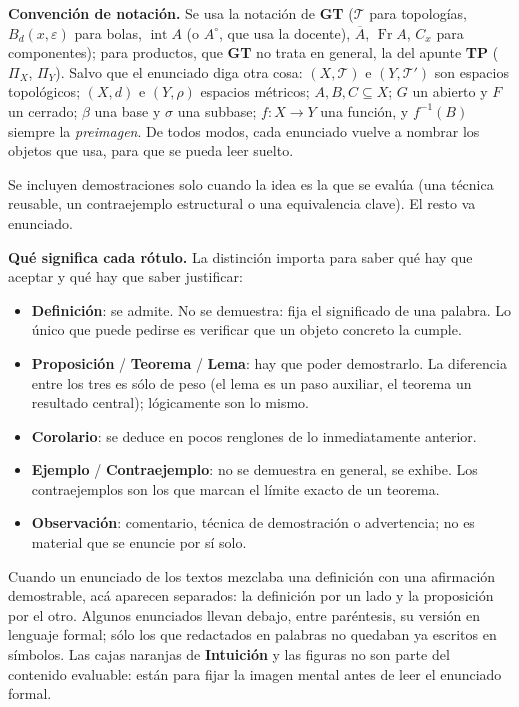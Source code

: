 \documentclass[11pt,a4paper]{article}
\newenvironment{lista}{\leavevmode\begin{itemize}[leftmargin=1.5em,itemsep=1pt,topsep=2pt,parsep=0pt]}{\end{itemize}}
\theoremstyle{definition}
\theoremstyle{plain}
\newcommand{\cl}[1]{\overline{#1}}
\newcommand{\intr}{\operatorname{int}}
\newcommand{\tp}{\mathcal{T}}
\begin{document}
\medskip
\noindent\textbf{Convención de notación.} Se usa la notación de \textbf{GT} ($\mathcal T$ para topologías, $B_d(x,\varepsilon)$ para bolas, $\intr A$ (o $A^\circ$, que usa la docente), $\cl A$, $\operatorname{Fr}A$, $C_x$ para componentes); para productos, que \textbf{GT} no trata en general, la del apunte \textbf{TP} ($\Pi_X$, $\Pi_Y$). Salvo que el enunciado diga otra cosa: $(X,\tp)$ e $(Y,\tp')$ son espacios topológicos; $(X,d)$ e $(Y,\rho)$ espacios métricos; $A,B,C\subseteq X$; $G$ un abierto y $F$ un cerrado; $\beta$ una base y $\sigma$ una subbase; $f:X\to Y$ una función, y $f^{-1}(B)$ siempre la \emph{preimagen}. De todos modos, cada enunciado vuelve a nombrar los objetos que usa, para que se pueda leer suelto.

\noindent Se incluyen demostraciones solo cuando la idea es la que se evalúa (una técnica reusable, un contraejemplo estructural o una equivalencia clave). El resto va enunciado.

\medskip
\noindent\textbf{Qué significa cada rótulo.} La distinción importa para saber qué hay que aceptar y qué hay que saber justificar:
\begin{lista}
\item \textbf{Definición}: se admite. No se demuestra: fija el significado de una palabra. Lo único que puede pedirse es verificar que un objeto concreto la cumple.
\item \textbf{Proposición} / \textbf{Teorema} / \textbf{Lema}: hay que poder demostrarlo. La diferencia entre los tres es sólo de peso (el lema es un paso auxiliar, el teorema un resultado central); lógicamente son lo mismo.
\item \textbf{Corolario}: se deduce en pocos renglones de lo inmediatamente anterior.
\item \textbf{Ejemplo} / \textbf{Contraejemplo}: no se demuestra en general, se exhibe. Los contraejemplos son los que marcan el límite exacto de un teorema.
\item \textbf{Observación}: comentario, técnica de demostración o advertencia; no es material que se enuncie por sí solo.
\end{lista}
\noindent Cuando un enunciado de los textos mezclaba una definición con una afirmación demostrable, acá aparecen separados: la definición por un lado y la proposición por el otro. Algunos enunciados llevan debajo, entre paréntesis, su versión en lenguaje formal; sólo los que redactados en palabras no quedaban ya escritos en símbolos. Las cajas naranjas de \textbf{Intuición} y las figuras no son parte del contenido evaluable: están para fijar la imagen mental antes de leer el enunciado formal.
\end{document}
